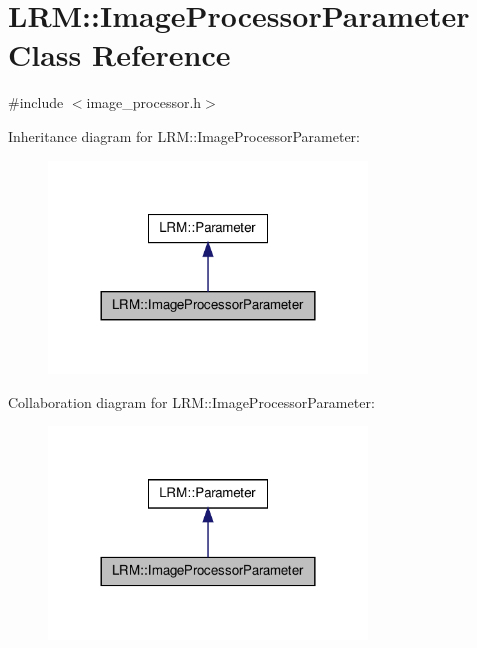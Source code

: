 \hypertarget{classLRM_1_1ImageProcessorParameter}{\section{\-L\-R\-M\-:\-:\-Image\-Processor\-Parameter \-Class \-Reference}
\label{classLRM_1_1ImageProcessorParameter}
}


{\ttfamily \#include $<$image\-\_\-processor.\-h$>$}



\-Inheritance diagram for \-L\-R\-M\-:\-:\-Image\-Processor\-Parameter\-:\nopagebreak
\begin{figure}[H]
\begin{center}
\leavevmode
\includegraphics[width=240pt]{classLRM_1_1ImageProcessorParameter__inherit__graph}
\end{center}
\end{figure}


\-Collaboration diagram for \-L\-R\-M\-:\-:\-Image\-Processor\-Parameter\-:\nopagebreak
\begin{figure}[H]
\begin{center}
\leavevmode
\includegraphics[width=240pt]{classLRM_1_1ImageProcessorParameter__coll__graph}
\end{center}
\end{figure}

